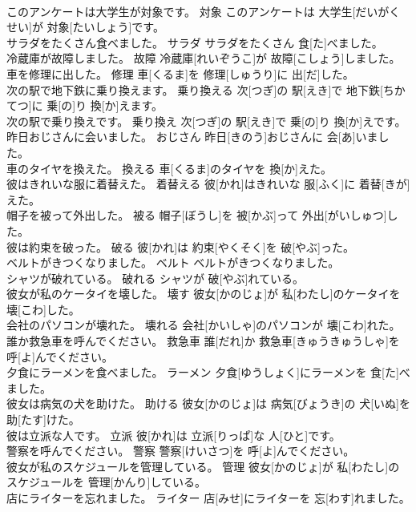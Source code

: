 \documentclass[8pt]{extreport}
\begin{document}
\begin{CJK}{UTF8}{min}
\\	このアンケートは大学生が対象です。	対象	このアンケートは 大学生[だいがくせい]が 対象[たいしょう]です。	
\\	サラダをたくさん食べました。	サラダ	サラダをたくさん 食[た]べました。	
\\	冷蔵庫が故障しました。	故障	冷蔵庫[れいぞうこ]が 故障[こしょう]しました。	
\\	車を修理に出した。	修理	車[くるま]を 修理[しゅうり]に 出[だ]した。	
\\	次の駅で地下鉄に乗り換えます。	乗り換える	次[つぎ]の 駅[えき]で 地下鉄[ちかてつ]に 乗[の]り 換[か]えます。	
\\	次の駅で乗り換えです。	乗り換え	次[つぎ]の 駅[えき]で 乗[の]り 換[か]えです。	
\\	昨日おじさんに会いました。	おじさん	昨日[きのう]おじさんに 会[あ]いました。	
\\	車のタイヤを換えた。	換える	車[くるま]のタイヤを 換[か]えた。	
\\	彼はきれいな服に着替えた。	着替える	彼[かれ]はきれいな 服[ふく]に 着替[きが]えた。	
\\	帽子を被って外出した。	被る	帽子[ぼうし]を 被[かぶ]って 外出[がいしゅつ]した。	
\\	彼は約束を破った。	破る	彼[かれ]は 約束[やくそく]を 破[やぶ]った。	
\\	ベルトがきつくなりました。	ベルト	ベルトがきつくなりました。	
\\	シャツが破れている。	破れる	シャツが 破[やぶ]れている。	
\\	彼女が私のケータイを壊した。	壊す	彼女[かのじょ]が 私[わたし]のケータイを 壊[こわ]した。	
\\	会社のパソコンが壊れた。	壊れる	会社[かいしゃ]のパソコンが 壊[こわ]れた。	
\\	誰か救急車を呼んでください。	救急車	誰[だれ]か 救急車[きゅうきゅうしゃ]を 呼[よ]んでください。	
\\	夕食にラーメンを食べました。	ラーメン	夕食[ゆうしょく]にラーメンを 食[た]べました。	
\\	彼女は病気の犬を助けた。	助ける	彼女[かのじょ]は 病気[びょうき]の 犬[いぬ]を 助[たす]けた。	
\\	彼は立派な人です。	立派	彼[かれ]は 立派[りっぱ]な 人[ひと]です。	
\\	警察を呼んでください。	警察	警察[けいさつ]を 呼[よ]んでください。	
\\	彼女が私のスケジュールを管理している。	管理	彼女[かのじょ]が 私[わたし]のスケジュールを 管理[かんり]している。	
\\	店にライターを忘れました。	ライター	店[みせ]にライターを 忘[わす]れました。	

\end{CJK}
\end{document}
